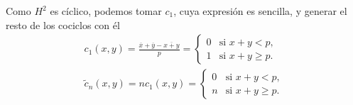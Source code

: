 	Como $H^2$ es cíclico, podemos tomar $c_1$, cuya expresión es sencilla, y generar el resto de los cociclos con él
	\begin{gather*}
	    c_1(x,y) = \frac{\overline{x} + \overline{y} - \overline{x+y}}{p} =  \begin{cases}
	        0 & \text{si } x+y < p,\\
	        1 & \text{si } x+y \geq p.
	        \end{cases} \\
	    \tilde c_n(x,y) = nc_1(x,y) =  \begin{cases}
	        0 & \text{si } x+y < p,\\
	        n & \text{si } x+y \geq p.
	        \end{cases}
	\end{gather*}
